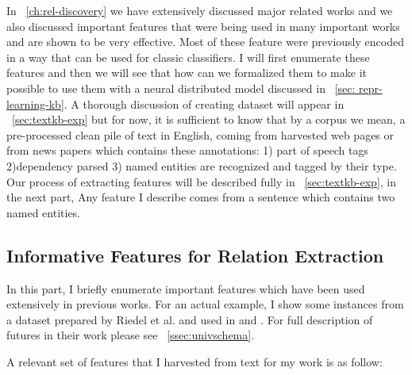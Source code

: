 In ~\autoref{ch:rel-discovery} we have extensively discussed major related works
and we also discussed important features that were being used in many important
works and are shown to be very effective. Most of these feature were previously
encoded in a way that can be used for classic classifiers. I will first
enumerate these features and then we will see that how can we formalized them
to make it possible to use them with a neural distributed model discussed in
~\autoref{sec: repr-learning-kb}. A thorough discussion of creating dataset will
appear in ~\autoref{sec:textkb-exp} but for now, it is sufficient to know that
by a corpus we mean, a pre-processed clean pile of text in English, coming from harvested web
pages or from news papers which contains these annotations: 1) part of speech
tags 2)dependency parsed 3) named entities are recognized and tagged by their
type. Our process of extracting features will be described fully in
~\autoref{sec:textkb-exp}, in the next part, Any feature I describe comes from a
sentence which contains two named entities. 

\subsection{Informative Features for Relation Extraction}
In this part, I briefly enumerate important features which have been used
extensively in previous works. For an actual example, I show some instances from
a dataset prepared by Riedel et al. and used in \cite{Riedel2013} and
\cite{Riedel2010a}. For full description of futures in their work please see
~\autoref{ssec:univschema}.

A relevant set of features that I harvested from text for my work is as follow:

